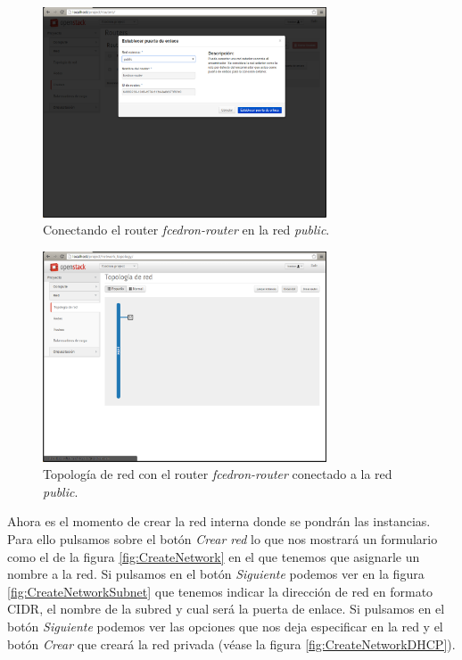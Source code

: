 \documentclass{article}
\begin{document}
\begin{figure}[h]
  \centering
    \includegraphics[width=0.75\textwidth]{img/m_016.png}
  \caption{Conectando el router \emph{fcedron-router} en la red \emph{public}.}
  \label{fig:RouterGateway}
\end{figure}

\begin{figure}[h]
  \centering
    \includegraphics[width=0.75\textwidth]{img/m_017.png}
  \caption{Topología de red con el router \emph{fcedron-router} conectado a la red \emph{public}.}
  \label{fig:NetworkRouterPublic}
\end{figure}

	Ahora es el momento de crear la red interna donde se pondrán las instancias. Para ello pulsamos sobre el botón \emph{Crear red} lo que nos mostrará un formulario como el de la figura \ref{fig:CreateNetwork} en el que tenemos que asignarle un nombre a la red. Si pulsamos en el botón \emph{Siguiente} podemos ver en la figura \ref{fig:CreateNetworkSubnet} que tenemos indicar la dirección de red en formato CIDR, el nombre de la subred y cual será la puerta de enlace. Si pulsamos en el botón \emph{Siguiente} podemos ver las opciones que nos deja especificar en la red y el botón \emph{Crear} que creará la red privada (véase la figura \ref{fig:CreateNetworkDHCP}).
\end{document}
